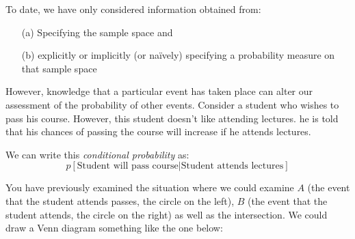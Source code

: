 \documentclass[12pt]{extbook}
\begin{document}
To date, we have only considered information obtained from:


\begin{itemize}
\item[(a)] Specifying the sample space and
\item[(b)] explicitly or implicitly (or na\"ively) specifying a probability measure on that sample space
\end{itemize}

However, knowledge that a particular event has taken place can alter our assessment of the probability of other events.   Consider a student who wishes to pass his course.   However, this student doesn't like attending lectures.   he is told that his chances of passing the course will increase if he attends lectures.

We can write this \emph{conditional probability} as:
\begin{displaymath}
p[\mbox{Student will pass course} | \mbox{Student attends lectures}]
\end{displaymath}

 

You have previously examined the situation where we could examine $A$ (the event that the student attends passes, the circle on the left), $B$ (the event that the student attends, the circle on the right) as well as the intersection.   We could draw a Venn diagram something like the one below:


\def\firstcircle{(0,0) circle (1.5cm)}
\def\secondcircle{(0:2cm) circle (1.5cm)}



\setlength{\parskip}{5mm}


\end{document}
